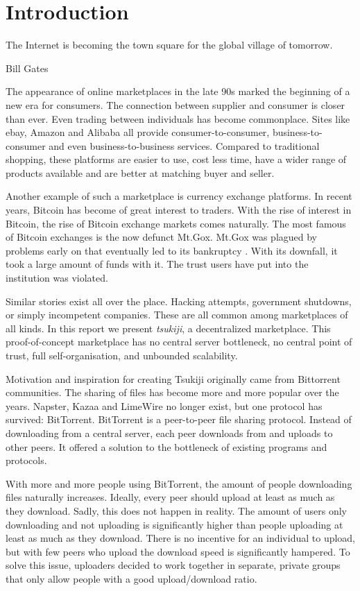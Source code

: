 \section{Introduction}
\epigraph{The Internet is becoming the town square for the global village of tomorrow.}{Bill Gates}

The appearance of online marketplaces in the late 90s marked the beginning of a new era for consumers.
The connection between supplier and consumer is closer than ever.
Even trading between individuals has become commonplace.
Sites like ebay, Amazon and Alibaba all provide consumer-to-consumer, business-to-consumer and even business-to-business services.
Compared to traditional shopping, these platforms are easier to use, cost less time, have a wider range of products available and are better at matching buyer and seller.

Another example of such a marketplace is currency exchange platforms.
In recent years, Bitcoin has become of great interest to traders.
With the rise of interest in Bitcoin, the rise of Bitcoin exchange markets comes naturally.
The most famous of Bitcoin exchanges is the now defunct Mt.Gox.
Mt.Gox was plagued by problems early on that eventually led to its bankruptcy \cite{gox}.
With its downfall, it took a large amount of funds with it.
The trust users have put into the institution was violated.


Similar stories exist all over the place. Hacking attempts, government shutdowns, or simply incompetent companies.
These are all common among marketplaces of all kinds.
In this report we present \textit{tsukiji}, a decentralized marketplace.
This proof-of-concept marketplace has no central server bottleneck, no central point of trust, full self-organisation, and unbounded scalability.

Motivation and inspiration for creating Tsukiji originally came from Bittorrent communities.
The sharing of files has become more and more popular over the years.
Napster, Kazaa and LimeWire no longer exist, but one protocol has survived: BitTorrent.
BitTorrent is a peer-to-peer file sharing protocol.
Instead of downloading from a central server, each peer downloads from and uploads to other peers.
It offered a solution to the bottleneck of existing programs and protocols.

With more and more people using BitTorrent, the amount of people downloading files naturally increases.
Ideally, every peer should upload at least as much as they download.\cite{bittorrent}
Sadly, this does not happen in reality.
The amount of users only downloading and not uploading is significantly higher than people uploading at least as much as they download.
There is no incentive for an individual to upload, but with few peers who upload the download speed is significantly hampered.
To solve this issue, uploaders decided to work together in separate, private groups that only allow people with a good upload/download ratio.

